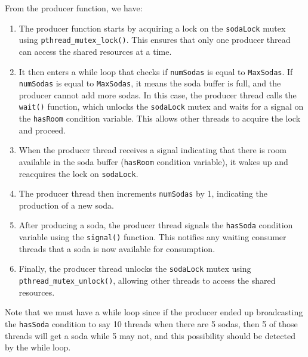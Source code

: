 \documentclass{article}
\begin{document}
\begin{example}
      From the producer function, we have: 

      \begin{enumerate}
        \item The producer function starts by acquiring a lock on the \texttt{sodaLock} mutex using \texttt{pthread\_mutex\_lock()}. This ensures that only one producer thread can access the shared resources at a time.

        \item It then enters a while loop that checks if \texttt{numSodas} is equal to \texttt{MaxSodas}. If \texttt{numSodas} is equal to \texttt{MaxSodas}, it means the soda buffer is full, and the producer cannot add more sodas. In this case, the producer thread calls the \texttt{wait()} function, which unlocks the \texttt{sodaLock} mutex and waits for a signal on the \texttt{hasRoom} condition variable. This allows other threads to acquire the lock and proceed.

        \item When the producer thread receives a signal indicating that there is room available in the soda buffer (\texttt{hasRoom} condition variable), it wakes up and reacquires the lock on \texttt{sodaLock}.

        \item The producer thread then increments \texttt{numSodas} by 1, indicating the production of a new soda.

        \item After producing a soda, the producer thread signals the \texttt{hasSoda} condition variable using the \texttt{signal()} function. This notifies any waiting consumer threads that a soda is now available for consumption.

        \item Finally, the producer thread unlocks the \texttt{sodaLock} mutex using \texttt{pthread\_mutex\_unlock()}, allowing other threads to access the shared resources.

      \end{enumerate}
      Note that we must have a while loop since if the producer ended up broadcasting the \texttt{hasSoda} condition to say 10 threads when there are 5 sodas, then 5 of those threads will get a soda while 5 may not, and this possibility should be detected by the while loop. 
    \end{example}
\end{document}

